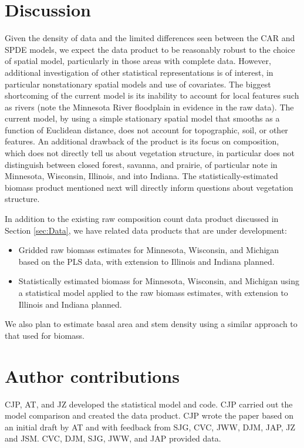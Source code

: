 \documentclass[12pt]{article}\usepackage[]{graphicx}\usepackage[]{color}
\begin{document}
\section{Discussion\label{sec:Discussion}}

Given the density of data and the limited differences seen between
the CAR and SPDE models, we expect the data product to be reasonably
robust to the choice of spatial model, particularly in those areas
with complete data. However, additional investigation of other statistical
representations is of interest, in particular nonstationary spatial
models and use of covariates. The biggest shortcoming of the current
model is its inability to account for local features such as rivers
(note the Minnesota River floodplain in evidence in the raw data).
The current model, by using a simple stationary spatial model that
smooths as a function of Euclidean distance, does not account for
topographic, soil, or other features. An additional drawback of the
product is its focus on composition, which does not directly tell
us about vegetation structure, in particular does not distinguish
between closed forest, savanna, and prairie, of particular note in
Minnesota, Wisconsin, Illinois, and into Indiana. The statistically-estimated
biomass product mentioned next will directly inform questions about
vegetation structure. 

In addition to the existing raw composition count data product discussed
in Section \ref{sec:Data}, we have related data products that are
under development:
\begin{itemize}
\item Gridded raw biomass estimates for Minnesota, Wisconsin, and Michigan
based on the PLS data, with extension to Illinois and Indiana planned. 
\item Statistically estimated biomass for Minnesota, Wisconsin, and Michigan
using a statistical model applied to the raw biomass estimates, with
extension to Illinois and Indiana planned.
\end{itemize}
We also plan to estimate basal area and stem density using a similar
approach to that used for biomass.




\section*{Author contributions}

CJP, AT, and JZ developed the statistical model and code. CJP carried
out the model comparison and created the data product. CJP wrote the
paper based on an initial draft by AT and with feedback from SJG,
CVC, JWW, DJM, JAP, JZ and JSM. CVC, DJM, SJG, JWW, and JAP provided
data. 
\end{document}
